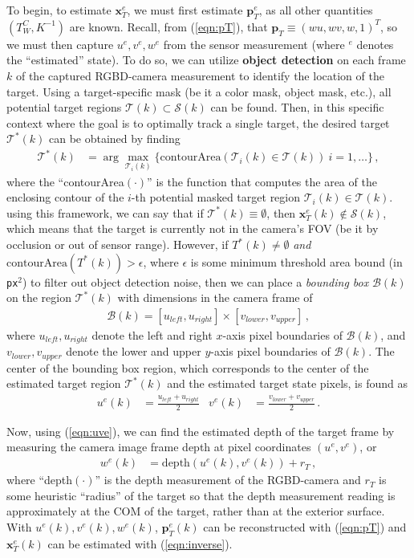 \documentclass[11pt]{article}
\begin{document}
To begin, to estimate $\mathbf x_T^e$, we must first estimate $\mathbf p_T^e$, as all other quantities $(T_W^C,K^{-1})$ are known. Recall, from (\ref{eqn:pT}), that $\mathbf p_T\equiv(wu,wv,w,1)^T$, so we must then capture $u^e,v^e,w^e$ from the sensor measurement (where ${}^e$ denotes the ``estimated'' state). To do so, we can utilize \textbf{object detection} on each frame $k$ of the captured RGBD-camera measurement to identify the location of the target. Using a target-specific mask (be it a color mask, object mask, etc.), all potential target regions $\mathcal T(k)\subset\mathcal S(k)$ can be found. Then, in this specific context where the goal is to optimally track a single target, the desired target $\mathcal T^*(k)$ can be obtained by finding
\begin{align*}
    \mathcal T^*(k)&=\arg\max_{\mathcal T_i(k)}\{\text{contourArea}(\mathcal T_i(k)\in\mathcal T(k))\ i=1,\dots\}\,,
\end{align*}
where the ``contourArea$(\cdot)$'' is the function that computes the area of the enclosing contour of the $i$-th potential masked target region $\mathcal T_i(k)\in\mathcal T(k)$. using this framework, we can say that if $\mathcal T^*(k)\equiv\emptyset$, then $\mathbf x_T^e(k)\notin\mathcal S(k)$, which means that the target is currently not in the camera's FOV (be it by occlusion or out of sensor range). However, if $T^*(k)\neq\emptyset$ \textit{and} $\text{contourArea}(T^*(k))>\epsilon$, where $\epsilon$ is some minimum threshold area bound (in \texttt{px}$^2$) to filter out object detection noise, then we can place a \textit{bounding box} $\mathcal B(k)$ on the region $\mathcal T^*(k)$ with dimensions in the camera frame of
\begin{align}\label{eqn:boundingbox}
    \mathcal B(k)=[u_{left},u_{right}]\times[v_{lower},v_{upper}]\,,
\end{align}
where $u_{left},u_{right}$ denote the left and right $x$-axis pixel boundaries of $\mathcal B(k)$, and $v_{lower},v_{upper}$ denote the lower and upper $y$-axis pixel boundaries of $\mathcal B(k)$. The center of the bounding box region, which corresponds to the center of the estimated target region $\mathcal T^*(k)$ and the estimated target state pixels, is found as
\begin{align}\label{eqn:uve}
    u^e(k)&=\frac{u_{left}+u_{right}}2 & v^e(k)&=\frac{v_{lower}+v_{upper}}2\,.
\end{align}

Now, using (\ref{eqn:uve}), we can find the estimated depth of the target frame by measuring the camera image frame depth at pixel coordinates $(u^e,v^e)$, or
\begin{align}\label{eqn:we}
    w^e(k)&=\text{depth}(u^e(k),v^e(k))+r_T\,,
\end{align}
where ``depth$(\cdot)$'' is the depth measurement of the RGBD-camera and $r_T$ is some heuristic ``radius'' of the target so that the depth measurement reading is approximately at the COM of the target, rather than at the exterior surface. With $u^e(k),v^e(k),w^e(k)$, $\mathbf p_T^e(k)$ can be reconstructed with (\ref{eqn:pT}) and $\mathbf x_T^e(k)$ can be estimated with (\ref{eqn:inverse}).
\end{document}
